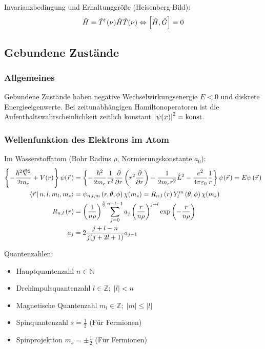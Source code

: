 \documentclass[11pt]{article}
\numberwithin{equation}{section}
\begin{document}
				\noindent
				Invarianzbedingung und Erhaltunggröße (Heisenberg-Bild):
				\begin{equation}
					\hat{H} =\hat{T}^\dagger(\nu)\hat{H} \hat{T}(\nu) \Leftrightarrow \left[\hat{H},\hat{G}\right] = 0
				\end{equation}

		\subsection{Gebundene Zustände}
			\subsubsection{Allgemeines}
				\noindent
				Gebundene Zustände haben negative Wechselwirkungsenergie $E<0$ und diskrete Energieeigenwerte. Bei zeitunabhängigen Hamiltonoperatoren ist die Aufenthaltswahrscheinlichkeit zeitlich konstant $\left|\psi(x)\right|^2=\mathrm{konst.}$

			\subsubsection{Wellenfunktion des Elektrons im Atom}
				\noindent
				Im Wasserstoffatom (Bohr Radius $\rho$, Normierungskonstante $a_0$):
				\begin{equation}
					\begin{aligned}
						\cBr{-\frac{\hbar^2 \Nabla^2}{2 m_e} + V(r)}\psi(\pvec{r})
						&= \cBr{-\frac{\hbar^2}{2 m_e}\frac{1}{r^2}\pder{}{r}\Br{r^2\pder{}{r}} + \frac{1}{2 m_e r^2} \hat{L}^2 - \frac{e^2}{4\pi\varepsilon_0}\frac{1}{r}}\psi(\pvec{r})
						= E \psi\Br{\pvec{r}}
						\\
						\Braket{\vec{r}|n,l,m_l,m_s} &= \psi_{n,l,m}\left(r,\theta,\phi\right)\chi(m_s)
						= R_{n,l}\left(r\right) Y_l^m\left(\theta,\phi\right)\chi(m_s) \\
						R_{n,l}\left(r\right)
						&= \left(\frac{1}{n\rho}\right)^{\frac{3}{2}}
						\sum_{j=0}^{n-l-1} a_j \left(\frac{r}{n\rho}\right)^{j+l} \exp\left({-\frac{r}{n\rho}}\right) \\
						a_j &= 2\frac{j+l-n}{j(j+2l+1)} a_{j-1} \\
					\end{aligned}
				\end{equation}

				\noindent
				Quantenzahlen:
				\begin{itemize}
					\item Hauptquantenzahl $n \in \mathbb{N}$
					\item Drehimpulsquantenzahl $l \in \mathbb{Z};\; \left|l\right| < n$
					\item Magnetische Quantenzahl $m_l \in \mathbb{Z};\; \left|m\right| \le \left|l\right|$
					\item Spinquantenzahl $s = \frac{1}{2}$ (Für Fermionen)
					\item Spinprojektion $m_s = \pm \frac{1}{2}$ (Für Fermionen)
				\end{itemize}
\end{document}
